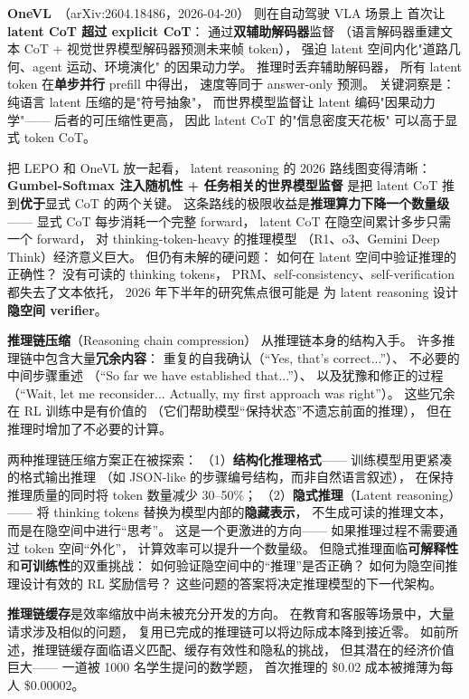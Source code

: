 \textbf{OneVL}~\cite{onevl2026}（arXiv:2604.18486，2026-04-20）
则在自动驾驶 VLA 场景上
首次让 \textbf{latent CoT 超过 explicit CoT}：
通过\textbf{双辅助解码器}监督
（语言解码器重建文本 CoT + 视觉世界模型解码器预测未来帧 token），
强迫 latent 空间内化"道路几何、agent 运动、环境演化"
的因果动力学。
推理时丢弃辅助解码器，
所有 latent token 在\textbf{单步并行} prefill 中得出，
速度等同于 answer-only 预测。
关键洞察是：纯语言 latent 压缩的是"符号抽象"，
而世界模型监督让 latent 编码"因果动力学"——
后者的可压缩性更高，
因此 latent CoT 的"信息密度天花板"
可以高于显式 token CoT。

把 LEPO 和 OneVL 放一起看，
latent reasoning 的 2026 路线图变得清晰：
\textbf{Gumbel-Softmax 注入随机性 + 任务相关的世界模型监督}
是把 latent CoT 推到\textbf{优于}显式 CoT 的两个关键。
这条路线的极限收益是\textbf{推理算力下降一个数量级}——
显式 CoT 每步消耗一个完整 forward，
latent CoT 在隐空间累计多步只需一个 forward，
对 thinking-token-heavy 的推理模型
（R1、o3、Gemini Deep Think）经济意义巨大。
但仍有未解的硬问题：
如何在 latent 空间中验证推理的正确性？
没有可读的 thinking tokens，
PRM、self-consistency、self-verification 都失去了文本依托，
2026 年下半年的研究焦点很可能是
为 latent reasoning 设计\textbf{隐空间 verifier}。

\textbf{推理链压缩}（Reasoning chain compression）
从推理链本身的结构入手。
许多推理链中包含大量\textbf{冗余内容}：
重复的自我确认（“Yes, that's correct...”）、
不必要的中间步骤重述
（“So far we have established that...”）、
以及犹豫和修正的过程
（“Wait, let me reconsider... Actually, my first approach was right”）。
这些冗余在 RL 训练中是有价值的
（它们帮助模型“保持状态”不遗忘前面的推理），
但在推理时增加了不必要的计算。

两种推理链压缩方案正在被探索：
（1）\textbf{结构化推理格式}——
训练模型用更紧凑的格式输出推理
（如 JSON-like 的步骤编号结构，而非自然语言叙述），
在保持推理质量的同时将 token 数量减少 30--50\%；
（2）\textbf{隐式推理}（Latent reasoning）——
将 thinking tokens 替换为模型内部的\textbf{隐藏表示}，
不生成可读的推理文本，
而是在隐空间中进行“思考”。
这是一个更激进的方向——
如果推理过程不需要通过 token 空间“外化”，
计算效率可以提升一个数量级。
但隐式推理面临\textbf{可解释性}和\textbf{可训练性}的双重挑战：
如何验证隐空间中的“推理”是否正确？
如何为隐空间推理设计有效的 RL 奖励信号？
这些问题的答案将决定推理模型的下一代架构。

\textbf{推理链缓存}是效率缩放中尚未被充分开发的方向。
在教育和客服等场景中，大量请求涉及相似的问题，
复用已完成的推理链可以将边际成本降到接近零。
如前所述，推理链缓存面临语义匹配、缓存有效性和隐私的挑战，
但其潜在的经济价值巨大——
一道被 1000 名学生提问的数学题，
首次推理的 \$0.02 成本被摊薄为每人 \$0.00002。

